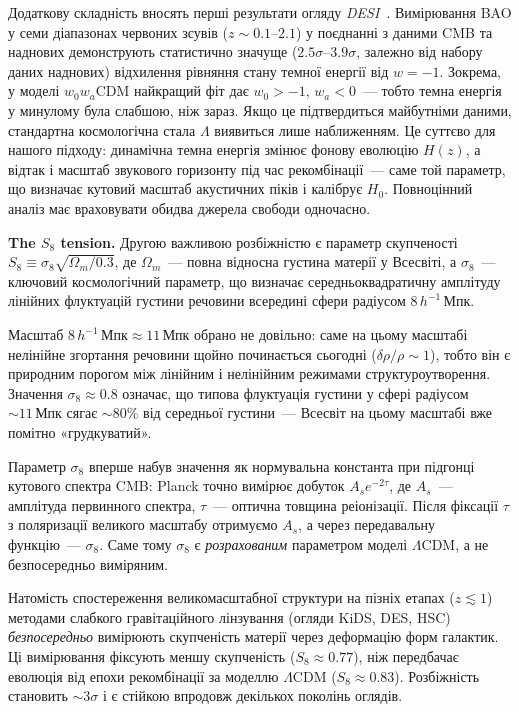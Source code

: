 Додаткову складність вносять перші результати огляду \emph{DESI}~\cite{DESI2024}. Вимірювання BAO у семи діапазонах червоних зсувів ($z \sim 0.1$--$2.1$) у поєднанні з даними CMB та наднових демонструють статистично значуще ($2.5\sigma$--$3.9\sigma$, залежно від набору даних наднових) відхилення рівняння стану темної енергії від $w=-1$. Зокрема, у моделі $w_0 w_a$CDM найкращий фіт дає $w_0 > -1$, $w_a < 0$~--- тобто темна енергія у минулому була слабшою, ніж зараз. Якщо це підтвердиться майбутніми даними, стандартна космологічна стала $\Lambda$ виявиться лише наближенням. Це суттєво для нашого підходу: динамічна темна енергія змінює фонову еволюцію $H(z)$, а відтак і масштаб звукового горизонту під час рекомбінації~--- саме той параметр, що визначає кутовий масштаб акустичних піків і калібрує $H_0$. Повноцінний аналіз має враховувати обидва джерела свободи одночасно.

\textbf{The $S_8$ tension.}
Другою важливою розбіжністю є параметр скупченості $S_8 \equiv \sigma_8 \sqrt{\Omega_m / 0.3}$,
де $\Omega_m$~--- повна відносна густина матерії у Всесвіті, а $\sigma_8$~---
ключовий космологічний параметр, що визначає середньоквадратичну амплітуду
лінійних флуктуацій густини речовини всередині сфери радіусом $8\,h^{-1}\,\text{Мпк}$.

Масштаб $8\,h^{-1}\,\text{Мпк} \approx 11\,\text{Мпк}$ обрано не довільно: саме
на цьому масштабі нелінійне згортання речовини щойно починається сьогодні
($\delta\rho/\rho \sim 1$), тобто він є природним порогом між лінійним і
нелінійним режимами структуроутворення. Значення $\sigma_8 \approx 0.8$ означає,
що типова флуктуація густини у сфері радіусом $\sim 11\,\text{Мпк}$ сягає
$\sim 80\%$ від середньої густини~--- Всесвіт на цьому масштабі вже помітно
«грудкуватий».

Параметр $\sigma_8$ вперше набув значення як нормувальна константа при підгонці
кутового спектра CMB: Planck точно вимірює добуток $A_s e^{-2\tau}$, де $A_s$~---
амплітуда первинного спектра, $\tau$~--- оптична товщина реіонізації. Після
фіксації $\tau$ з поляризації великого масштабу отримуємо $A_s$, а через
передавальну функцію~--- $\sigma_8$. Саме тому $\sigma_8$ є \emph{розрахованим}
параметром моделі $\Lambda$CDM, а не безпосередньо виміряним.

Натомість спостереження великомасштабної структури на пізніх етапах
($z \lesssim 1$) методами слабкого гравітаційного лінзування (огляди KiDS,
DES, HSC) \emph{безпосередньо} вимірюють скупченість матерії через деформацію
форм галактик. Ці вимірювання фіксують меншу скупченість ($S_8 \approx 0.77$),
ніж передбачає еволюція від епохи рекомбінації за моделлю $\Lambda$CDM
($S_8 \approx 0.83$). Розбіжність становить $\sim 3\sigma$ і є стійкою
впродовж декількох поколінь оглядів.

